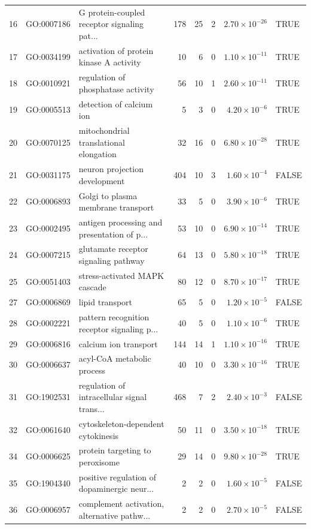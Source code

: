 \begin{table}[ht]
\begin{adjustbox}{max width=\textwidth}
\begin{tabular}{lllrrrrl}
  16 & GO:0007186 & G protein-coupled receptor signaling pat... & 178 & 25 & 2 & $2.70 \times 10^{-26}$ & TRUE \\ 
  17 & GO:0034199 & activation of protein kinase A activity & 10 & 6 & 0 & $1.10 \times 10^{-11}$ & TRUE \\ 
  18 & GO:0010921 & regulation of phosphatase activity & 56 & 10 & 1 & $2.60 \times 10^{-11}$ & TRUE \\ 
  19 & GO:0005513 & detection of calcium ion & 5 & 3 & 0 & $4.20 \times 10^{-6}$ & TRUE \\ 
  20 & GO:0070125 & mitochondrial translational elongation & 32 & 16 & 0 & $6.80 \times 10^{-28}$ & TRUE \\ 
  21 & GO:0031175 & neuron projection development & 404 & 10 & 3 & $1.60 \times 10^{-4}$ & FALSE \\ 
  22 & GO:0006893 & Golgi to plasma membrane transport & 33 & 5 & 0 & $3.90 \times 10^{-6}$ & TRUE \\ 
  23 & GO:0002495 & antigen processing and presentation of p... & 53 & 10 & 0 & $6.90 \times 10^{-14}$ & TRUE \\ 
  24 & GO:0007215 & glutamate receptor signaling pathway & 64 & 13 & 0 & $5.80 \times 10^{-18}$ & TRUE \\ 
  25 & GO:0051403 & stress-activated MAPK cascade & 80 & 12 & 0 & $8.70 \times 10^{-17}$ & TRUE \\ 
  27 & GO:0006869 & lipid transport & 65 & 5 & 0 & $1.20 \times 10^{-5}$ & FALSE \\ 
  28 & GO:0002221 & pattern recognition receptor signaling p... & 40 & 5 & 0 & $1.10 \times 10^{-6}$ & TRUE \\ 
  29 & GO:0006816 & calcium ion transport & 144 & 14 & 1 & $1.10 \times 10^{-16}$ & TRUE \\ 
  30 & GO:0006637 & acyl-CoA metabolic process & 40 & 10 & 0 & $3.30 \times 10^{-16}$ & TRUE \\ 
  31 & GO:1902531 & regulation of intracellular signal trans... & 468 & 7 & 2 & $2.40 \times 10^{-3}$ & FALSE \\ 
  32 & GO:0061640 & cytoskeleton-dependent cytokinesis & 50 & 11 & 0 & $3.50 \times 10^{-18}$ & TRUE \\ 
  34 & GO:0006625 & protein targeting to peroxisome & 29 & 14 & 0 & $9.80 \times 10^{-28}$ & TRUE \\ 
  35 & GO:1904340 & positive regulation of dopaminergic neur... & 2 & 2 & 0 & $1.60 \times 10^{-5}$ & FALSE \\ 
  36 & GO:0006957 & complement activation, alternative pathw... & 2 & 2 & 0 & $2.70 \times 10^{-5}$ & FALSE \\ 

\end{tabular}
\end{adjustbox}
\end{table}
